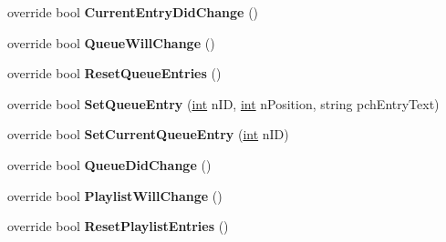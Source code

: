 \begin{DoxyCompactItemize}
\item 
\hypertarget{classValve_1_1Steamworks_1_1CSteamMusicRemote_a510a383336e178057a582767815aaa07}{}override bool {\bfseries Current\+Entry\+Did\+Change} ()\label{classValve_1_1Steamworks_1_1CSteamMusicRemote_a510a383336e178057a582767815aaa07}

\item 
\hypertarget{classValve_1_1Steamworks_1_1CSteamMusicRemote_a6bdf4094c48d045686558b76df47d6bf}{}override bool {\bfseries Queue\+Will\+Change} ()\label{classValve_1_1Steamworks_1_1CSteamMusicRemote_a6bdf4094c48d045686558b76df47d6bf}

\item 
\hypertarget{classValve_1_1Steamworks_1_1CSteamMusicRemote_abbe800735adf446705935e6afcf33dcb}{}override bool {\bfseries Reset\+Queue\+Entries} ()\label{classValve_1_1Steamworks_1_1CSteamMusicRemote_abbe800735adf446705935e6afcf33dcb}

\item 
\hypertarget{classValve_1_1Steamworks_1_1CSteamMusicRemote_aa7de6c5c95c5a2b688249d5b7cd5874e}{}override bool {\bfseries Set\+Queue\+Entry} (\hyperlink{SDL__thread_8h_a6a64f9be4433e4de6e2f2f548cf3c08e}{int} n\+I\+D, \hyperlink{SDL__thread_8h_a6a64f9be4433e4de6e2f2f548cf3c08e}{int} n\+Position, string pch\+Entry\+Text)\label{classValve_1_1Steamworks_1_1CSteamMusicRemote_aa7de6c5c95c5a2b688249d5b7cd5874e}

\item 
\hypertarget{classValve_1_1Steamworks_1_1CSteamMusicRemote_a590bb6292737e51f3c29b3df3cf2e785}{}override bool {\bfseries Set\+Current\+Queue\+Entry} (\hyperlink{SDL__thread_8h_a6a64f9be4433e4de6e2f2f548cf3c08e}{int} n\+I\+D)\label{classValve_1_1Steamworks_1_1CSteamMusicRemote_a590bb6292737e51f3c29b3df3cf2e785}

\item 
\hypertarget{classValve_1_1Steamworks_1_1CSteamMusicRemote_a04d1adc30b5444507fde1ba56893b0da}{}override bool {\bfseries Queue\+Did\+Change} ()\label{classValve_1_1Steamworks_1_1CSteamMusicRemote_a04d1adc30b5444507fde1ba56893b0da}

\item 
\hypertarget{classValve_1_1Steamworks_1_1CSteamMusicRemote_a604ac4630d7ac0a674df8fd87cb463be}{}override bool {\bfseries Playlist\+Will\+Change} ()\label{classValve_1_1Steamworks_1_1CSteamMusicRemote_a604ac4630d7ac0a674df8fd87cb463be}

\item 
\hypertarget{classValve_1_1Steamworks_1_1CSteamMusicRemote_af45b6bd17b75de3eed505431157dd28f}{}override bool {\bfseries Reset\+Playlist\+Entries} ()\label{classValve_1_1Steamworks_1_1CSteamMusicRemote_af45b6bd17b75de3eed505431157dd28f}


\end{DoxyCompactItemize}
